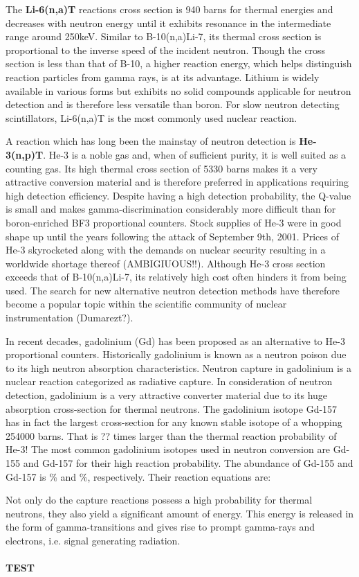 The {\bf Li-6(n,a)T} reactions cross section is 940 barns for thermal energies and decreases with neutron energy until it exhibits resonance in the intermediate range around 250keV.  Similar to B-10(n,a)Li-7, its thermal cross section is proportional to the inverse speed of the incident neutron.
Though the cross section is less than that of B-10, a higher reaction energy, which helps distinguish reaction particles from gamma rays, is at its advantage.
Lithium is widely available in various forms but exhibits no solid compounds applicable for neutron detection and is therefore less versatile than boron. For slow neutron detecting scintillators, Li-6(n,a)T is the most commonly used nuclear reaction. \newline

A reaction which has long been the mainstay of neutron detection is {\bf He-3(n,p)T}.
He-3 is a noble gas and, when of sufficient purity, it is well suited as a counting gas. Its high thermal cross section of 5330 barns makes it a very attractive conversion material and is therefore preferred in applications requiring high detection efficiency. Despite having a high detection probability, the Q-value is small and makes gamma-discrimination considerably more difficult than for boron-enriched BF3 proportional counters.
Stock supplies of He-3 were in good shape up until the years following the attack of September 9th, 2001. Prices of He-3 skyrocketed along with the demands on nuclear security resulting in a worldwide shortage thereof (AMBIGIUOUS!!). Although He-3 cross section exceeds that of B-10(n,a)Li-7, its relatively high cost often hinders it from being used. The search for new alternative neutron detection methods have therefore become a popular topic within the scientific community of nuclear instrumentation (Dumarezt?). \newline

In recent decades, gadolinium (Gd) has been proposed as an alternative to He-3 proportional counters. Historically gadolinium is known as a neutron poison due to its high neutron absorption characteristics. Neutron capture in gadolinium is a nuclear reaction categorized as radiative capture.
In consideration of neutron detection, gadolinium is a very attractive converter material due to its huge absorption cross-section for thermal neutrons. The gadolinium isotope Gd-157 has in fact the largest cross-section for any known stable isotope of a whopping 254000 barns. That is ?? times larger than the thermal reaction probability of He-3! The most common gadolinium isotopes used in neutron conversion are Gd-155 and Gd-157 for their high reaction probability. The abundance of Gd-155 and Gd-157 is \% and \%, respectively.
Their reaction equations are:

Not only do the capture reactions possess a high probability for thermal neutrons, they also yield a significant amount of energy. This energy is released in the form of gamma-transitions and gives rise to prompt gamma-rays and electrons, i.e. signal generating radiation.


\paragraph{TEST}
